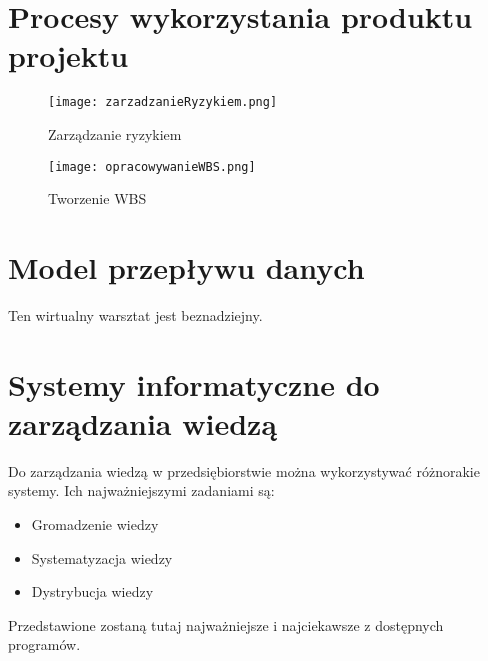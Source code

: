 
\section{Procesy wykorzystania produktu projektu}

\begin{figure}[!h]
\centering
\texttt{[image: zarzadzanieRyzykiem.png]}
\caption{Zarządzanie ryzykiem}
\label{fig:zarzadzanieRyzykiem}
\end{figure}

\begin{figure}[!h]
\centering
\texttt{[image: opracowywanieWBS.png]}
\caption{Tworzenie WBS}
\label{fig:opracowanieWBS}
\end{figure}

\clearpage


\section{Model przepływu danych}

Ten wirtualny warsztat jest beznadziejny.


\section{Systemy informatyczne do zarządzania wiedzą}

Do zarządzania wiedzą w przedsiębiorstwie można wykorzystywać różnorakie systemy. Ich najważniejszymi zadaniami są:
\begin{itemize}
\item Gromadzenie wiedzy
\item Systematyzacja wiedzy
\item Dystrybucja wiedzy
\end{itemize}

Przedstawione zostaną tutaj najważniejsze i najciekawsze z dostępnych programów.

